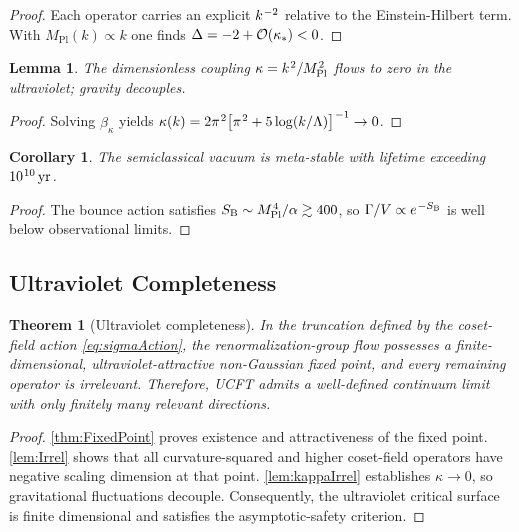 \documentclass[pdflatex,sn-mathphys-num]{sn-jnl}
\theoremstyle{thmstyleone}
\newtheorem{theorem}{Theorem}
\newtheorem{lemma}{Lemma}
\newtheorem{corollary}{Corollary}
\theoremstyle{thmstyletwo}%
\theoremstyle{thmstylethree}%
\newcommand{\sm}{\hspace{.065em}}
\newcommand{\smexp}[1]{^{\sm #1}}
\begin{document}
\begin{proof}
Each operator carries an explicit $k\smexp{-2}$ relative to the
Einstein-Hilbert term.  With
$M_{\mathrm{Pl}}(k)\propto k$ one finds
\(\Delta=-2+{\cal O}(\kappa_{\ast})<0\).
\end{proof}

\begin{lemma}\label{lem:kappaIrrel}
The dimensionless coupling
\(
  \kappa=k\smexp{2}/M_{\mathrm{Pl}}\smexp{2}
\)
flows to zero in the ultraviolet; gravity decouples.
\end{lemma}

\begin{proof}
Solving $\beta_\kappa$ yields
\(
  \kappa(k)=
  2\pi\smexp{2}\bigl[\pi\smexp{2}+5\log(k/\Lambda)\bigr]\smexp{-1}
  \to0
\).
\end{proof}

\begin{corollary}\label{cor:Metastable}
The semiclassical vacuum is meta-stable with lifetime exceeding
\(10\smexp{10}\,\mathrm{yr}\).
\end{corollary}

\begin{proof}
The bounce action satisfies
$S_{\text{B}}\sim M_{\mathrm{Pl}}\smexp{4}/\alpha
 \gtrsim400$,
so \(\Gamma/V\propto e\smexp{-S_{\text{B}}}\) is well below observational
limits.
\end{proof}

\subsection{Ultraviolet Completeness}
\label{subsec:UVComplete}

\begin{theorem}[Ultraviolet completeness]\label{thm:UVcomplete}
In the truncation defined by the coset-field action \eqref{eq:sigmaAction},
the renormalization-group flow possesses a finite-dimensional, ultraviolet-attractive
non-Gaussian fixed point, and every remaining operator is irrelevant.
Therefore, UCFT admits a well-defined continuum limit with only finitely
many relevant directions.
\end{theorem}

\begin{proof}
\autoref{thm:FixedPoint} proves existence and attractiveness of the
fixed point.
\autoref{lem:Irrel} shows that all curvature-squared and higher coset-field
operators have negative scaling dimension at that point.
\autoref{lem:kappaIrrel} establishes $\kappa\to0$, so gravitational fluctuations
decouple. Consequently, the ultraviolet critical surface is finite dimensional and
satisfies the asymptotic-safety criterion.
\end{proof}
\end{document}
